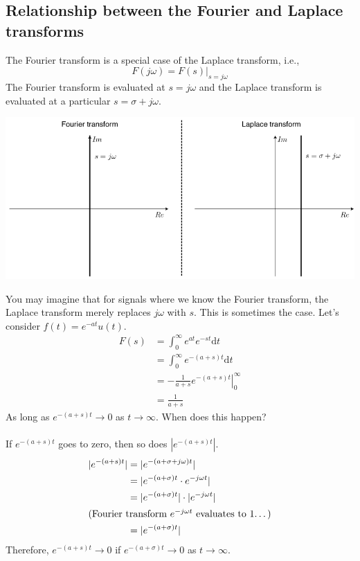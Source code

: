 \documentclass[10pt]{article}
\newcommand{\dd}{\text{d}}
\begin{document}
\subsection*{Relationship between the Fourier and Laplace transforms}
The Fourier transform is a special case of the Laplace transform, i.e.,
\[\boxed{F(j\omega) = F(s) \vert_{s=j\omega}}\]
The Fourier transform is evaluated at $s = j\omega$ and the Laplace transform is evaluated at a particular $s = \sigma + j\omega$.
\begin{center}
    \includegraphics*[scale=0.7]{W8_22.png}
\end{center}
You may imagine that for signals where we know the Fourier transform, the Laplace transform merely replaces $j\omega$ with $s$.  This is sometimes the case.  Let's consider $f(t) = e^{-at} u(t)$.
\begin{align*}
    F(s) &= \int_0^\infty e^{at} e^{-st} \dd t\\
    &= \int_0^\infty e^{-(a + s)t} \dd t\\
    &= \left.-\frac{1}{a + s} e^{-(a + s)t}\right|_0^\infty\\
    &= \frac{1}{a + s}
\end{align*}
As long as $e^{-(a + s)t} \rightarrow 0$ as $t \rightarrow \infty$.  When does this happen?\\\\
If $e^{-(a+s)t}$ goes to zero, then so does $|e^{-(a+s)t}|$.
\begin{align*}
    |e^{-(a+s)t}| &= |e^{-(a + \sigma + j\omega)t}|\\
    &= |e^{-(a+\sigma)t} \cdot e^{-j\omega t}|\\
    &= |e^{-(a+\sigma)t}| \cdot |e^{-j\omega t}|\\
    \intertext{(Fourier transform $e^{-j\omega t}$ evaluates to 1\dots)}
    &= |e^{-(a+\sigma)t}|
\end{align*}
Therefore, $e^{-(a+s) t} \rightarrow 0$ if $e^{-(a + \sigma)t} \rightarrow 0$ as $t \rightarrow \infty$.\\\\
\end{document}
